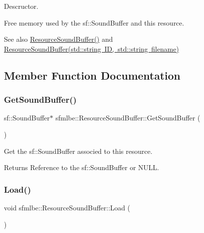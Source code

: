 Descructor. 

Free memory used by the sf\+::\+Sound\+Buffer and this resource. \begin{DoxySeeAlso}{See also}
\mbox{\hyperlink{classsfmlbe_1_1_resource_sound_buffer_a88d7088f7f0e02879c0a62563851cb67}{Resource\+Sound\+Buffer()}} and \mbox{\hyperlink{classsfmlbe_1_1_resource_sound_buffer_a6f01706abb7c87383e0ddffbf8650837}{Resource\+Sound\+Buffer(std\+::string I\+D, std\+::string filename)}} 
\end{DoxySeeAlso}


\subsection{Member Function Documentation}
\mbox{\label{classsfmlbe_1_1_resource_sound_buffer_a56043b6124e92d99a25e7756022088cb}} 
\subsubsection{\texorpdfstring{Get\+Sound\+Buffer()}{GetSoundBuffer()}}
{\footnotesize\ttfamily sf\+::\+Sound\+Buffer$\ast$ sfmlbe\+::\+Resource\+Sound\+Buffer\+::\+Get\+Sound\+Buffer (\begin{DoxyParamCaption}{ }\end{DoxyParamCaption})\hspace{0.3cm}{\ttfamily [inline]}}



Get the sf\+::\+Sound\+Buffer associed to this resource. 

\begin{DoxyReturn}{Returns}
Reference to the sf\+::\+Sound\+Buffer or N\+U\+LL. 
\end{DoxyReturn}
\mbox{\label{classsfmlbe_1_1_resource_sound_buffer_a1207531bb0e5355f90cf4a7f67734555}} 
\subsubsection{\texorpdfstring{Load()}{Load()}}
{\footnotesize\ttfamily void sfmlbe\+::\+Resource\+Sound\+Buffer\+::\+Load (\begin{DoxyParamCaption}{ }\end{DoxyParamCaption})\hspace{0.3cm}{\ttfamily [virtual]}}



